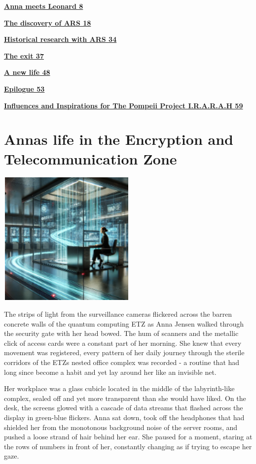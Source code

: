\documentclass[
]{article}
\begin{document}
\hyperref[anna-meets-leonard]{\textbf{Anna meets Leonard 8}}

\hyperref[the-discovery-of-ars]{\textbf{The discovery of ARS 18}}

\hyperref[historical-research-with-ars]{\textbf{Historical research with
ARS 34}}

\hyperref[the-exit]{\textbf{The exit 37}}

\hyperref[a-new-life]{\textbf{A new life 48}}

\hyperref[epilogue]{\textbf{Epilogue 53}}

\hyperref[influences-and-inspirations-for-the-pompeii-project-i.r.a.r.a.h]{\textbf{Influences
and Inspirations for The Pompeii Project I.R.A.R.A.H 59}}

\section{Anna\textquotesingle s life in the Encryption and
Telecommunication
Zone}\label{annas-life-in-the-encryption-and-telecommunication-zone}

\includegraphics[width=2.64583in,height=2.59375in]{media/image0002.png}

The strips of light from the surveillance cameras flickered across the
barren concrete walls of the quantum computing ETZ as Anna Jensen walked
through the security gate with her head bowed. The hum of scanners and
the metallic click of access cards were a constant part of her morning.
She knew that every movement was registered, every pattern of her daily
journey through the sterile corridors of the ETZ\textquotesingle s
nested office complex was recorded - a routine that had long since
become a habit and yet lay around her like an invisible net.

Her workplace was a glass cubicle located in the middle of the
labyrinth-like complex, sealed off and yet more transparent than she
would have liked. On the desk, the screens glowed with a cascade of data
streams that flashed across the display in green-blue flickers. Anna sat
down, took off the headphones that had shielded her from the monotonous
background noise of the server rooms, and pushed a loose strand of hair
behind her ear. She paused for a moment, staring at the rows of numbers
in front of her, constantly changing as if trying to escape her gaze.
\end{document}
